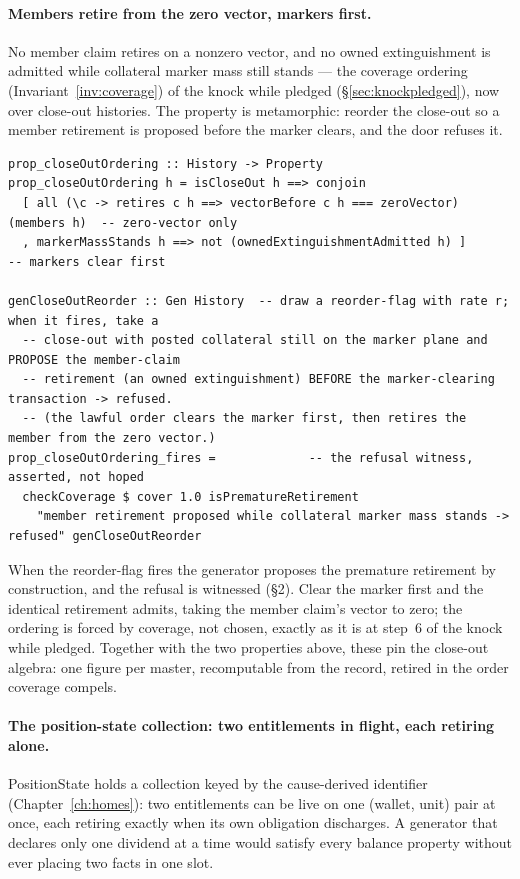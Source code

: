 \documentclass[11pt,a4paper]{article}
\begin{document}
\paragraph{Members retire from the zero vector, markers first.} No member claim retires on a
nonzero vector, and no owned extinguishment is admitted while collateral marker mass still
stands --- the coverage ordering (Invariant~\ref{inv:coverage}) of the knock while pledged
(\S\ref{sec:knockpledged}), now over close-out histories. The property is metamorphic:
reorder the close-out so a member retirement is proposed before the marker clears, and the
door refuses it.

\begin{lstlisting}
prop_closeOutOrdering :: History -> Property
prop_closeOutOrdering h = isCloseOut h ==> conjoin
  [ all (\c -> retires c h ==> vectorBefore c h === zeroVector) (members h)  -- zero-vector only
  , markerMassStands h ==> not (ownedExtinguishmentAdmitted h) ]             -- markers clear first

genCloseOutReorder :: Gen History  -- draw a reorder-flag with rate r; when it fires, take a
  -- close-out with posted collateral still on the marker plane and PROPOSE the member-claim
  -- retirement (an owned extinguishment) BEFORE the marker-clearing transaction -> refused.
  -- (the lawful order clears the marker first, then retires the member from the zero vector.)
prop_closeOutOrdering_fires =             -- the refusal witness, asserted, not hoped
  checkCoverage $ cover 1.0 isPrematureRetirement
    "member retirement proposed while collateral marker mass stands -> refused" genCloseOutReorder
\end{lstlisting}

When the reorder-flag fires the generator proposes the premature retirement by construction,
and the refusal is witnessed (\S 2). Clear the marker first and the identical retirement
admits, taking the member claim's vector to zero; the ordering is forced by coverage, not
chosen, exactly as it is at step~6 of the knock while pledged. Together with the two
properties above, these pin the close-out algebra: one figure per master, recomputable from
the record, retired in the order coverage compels.

\paragraph{The position-state collection: two entitlements in flight, each retiring alone.}
PositionState holds a collection keyed by the cause-derived identifier
(Chapter~\ref{ch:homes}): two entitlements can be live on one (wallet, unit) pair at once,
each retiring exactly when its own obligation discharges. A generator that declares only one
dividend at a time would satisfy every balance property without ever placing two facts in
one slot.
\end{document}
